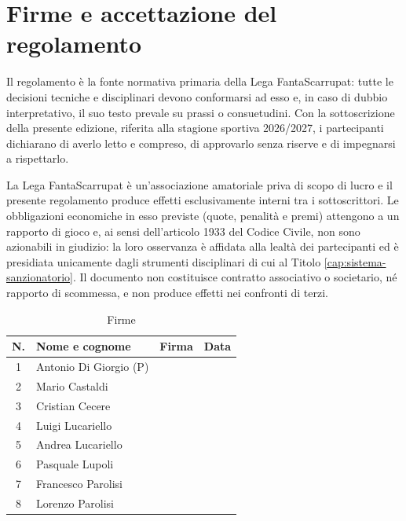 \chapter{Firme e accettazione del regolamento}
\label{cap:firme}

Il regolamento è la fonte normativa primaria della Lega FantaScarrupat: tutte le decisioni tecniche e disciplinari devono conformarsi ad esso e, in caso di dubbio interpretativo, il suo testo prevale su prassi o consuetudini. Con la sottoscrizione della presente edizione, riferita alla stagione sportiva 2026/2027, i partecipanti dichiarano di averlo letto e compreso, di approvarlo senza riserve e di impegnarsi a rispettarlo.

La Lega FantaScarrupat è un'associazione amatoriale priva di scopo di lucro e il presente regolamento produce effetti esclusivamente interni tra i sottoscrittori. Le obbligazioni economiche in esso previste (quote, penalità e premi) attengono a un rapporto di gioco e, ai sensi dell'articolo 1933 del Codice Civile, non sono azionabili in giudizio: la loro osservanza è affidata alla lealtà dei partecipanti ed è presidiata unicamente dagli strumenti disciplinari di cui al Titolo \ref{cap:sistema-sanzionatorio}. Il documento non costituisce contratto associativo o societario, né rapporto di scommessa, e non produce effetti nei confronti di terzi.

\begin{table}[!ht]
\centering
\begin{tabular}{|c|p{4.5cm}|p{4.5cm}|p{2.8cm}|}
\hline
\textbf{N.} & \textbf{Nome e cognome} & \textbf{Firma} & \textbf{Data} \\
\hline
1 & Antonio Di Giorgio (P) & & \\
\hline
2 & Mario Castaldi & & \\
\hline
3 & Cristian Cecere & & \\
\hline
4 & Luigi Lucariello & & \\
\hline
5 & Andrea Lucariello & & \\
\hline
6 & Pasquale Lupoli & & \\
\hline
7 & Francesco Parolisi & & \\
\hline
8 & Lorenzo Parolisi & & \\
\hline
\end{tabular}
\caption{Firme}
\end{table}
